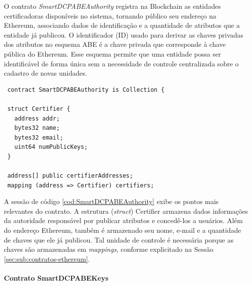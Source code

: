 \documentclass[a4paper,11pt]{article}
\begin{document}

O contrato \emph{SmartDCPABEAuthority} registra na Blockchain as entidades certificadoras disponíveis no sistema, tornando público seu endereço na Ethereum, associando dados de identificação e a quantidade de atributos que a entidade já publicou.
O identificador (ID) usado para derivar as chaves privadas dos atributos no esquema ABE é a chave privada que corresponde à chave pública do Ethereum.
Esse esquema permite que uma entidade possa ser identificável de forma única sem a necessidade de controle centralizada sobre o cadastro de novas unidades.


\begin{lstlisting}
 contract SmartDCPABEAuthority is Collection {

 struct Certifier {
   address addr;
   bytes32 name;
   bytes32 email;
   uint64 numPublicKeys;
 }

 address[] public certifierAddresses;
 mapping (address => Certifier) certifiers;
\end{lstlisting}


A sessão de código \ref{cod:SmartDCPABEAuthority} exibe os pontos mais relevantes do contrato.
A estrutura (\textit{struct}) Certifier armazena dados informações da autoridade responsável por publicar atributos e concedê-los a usuários.
Além do endereço Ethereum, também é armazenado seu nome, e-mail e a quantidade de chaves que ele já publicou.
Tal unidade de controle é necessária porque as chaves são armazenadas em \emph{mappings}, conforme explicitado na Sessão \ref{sec:sub:contratos-ethereum}.

\paragraph{Contrato SmartDCPABEKeys}
\end{document}
